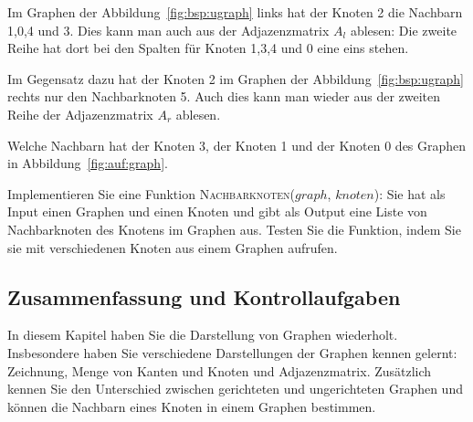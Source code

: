 \begin{mbsp}
Im Graphen der Abbildung~\ref{fig:bsp:ugraph} links hat der Knoten 2 die Nachbarn 1,0,4 und 3. 
Dies kann man auch aus der Adjazenzmatrix $A_l$ ablesen: Die zweite Reihe hat dort bei den Spalten f\"ur Knoten 1,3,4 und 0 eine eins stehen.

Im Gegensatz dazu hat der Knoten 2 im Graphen der Abbildung~\ref{fig:bsp:ugraph} rechts nur den Nachbarknoten 5. 
Auch dies kann man wieder aus der zweiten Reihe der Adjazenzmatrix $A_r$ ablesen.
\end{mbsp}

\begin{aufg}
Welche Nachbarn hat der Knoten 3, der Knoten 1 und der Knoten 0 des Graphen in Abbildung~\ref{fig:auf:graph}.
\end{aufg}


\begin{aufg}
Implementieren Sie eine Funktion \textsc{Nachbarknoten($graph$, $knoten$)}: Sie hat als Input einen Graphen und einen Knoten und gibt als Output eine Liste von Nachbarknoten des Knotens im Graphen aus. Testen Sie die Funktion, indem Sie sie mit verschiedenen Knoten aus einem Graphen aufrufen.
\end{aufg}

\subsection{Zusammenfassung und Kontrollaufgaben}

In diesem Kapitel haben Sie die Darstellung von Graphen wiederholt. 
Insbesondere haben Sie verschiedene Darstellungen der Graphen kennen gelernt: Zeichnung, Menge von Kanten und Knoten und Adjazenzmatrix.
Zusätzlich kennen Sie den Unterschied zwischen gerichteten und ungerichteten Graphen und können die Nachbarn eines Knoten in einem Graphen bestimmen. 



